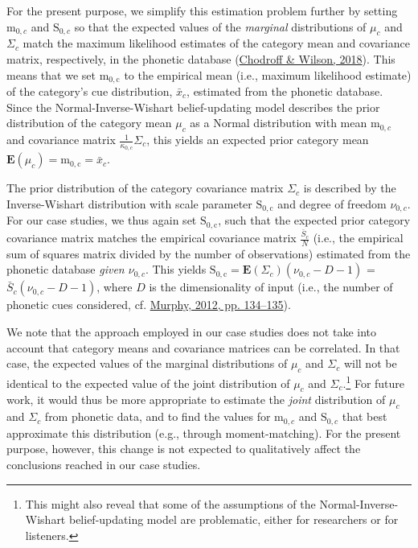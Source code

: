 \documentclass[
  11pt,
  english,
  man,floatsintext]{apa6}
\begin{document}
For the present purpose, we simplify this estimation problem further by setting \(\mathrm{m}_{0,c}\) and \(\mathrm{S}_{0,c}\) so that the expected values of the \emph{marginal} distributions of \(\mu_c\) and \(\Sigma_c\) match the maximum likelihood estimates of the category mean and covariance matrix, respectively, in the phonetic database (\protect\hyperlink{ref-chodroff-wilson2018}{Chodroff \& Wilson, 2018}). This means that we set \(\mathrm{m_{0,c}}\) to the empirical mean (i.e., maximum likelihood estimate) of the category's cue distribution, \(\bar{x}_c\), estimated from the phonetic database. Since the Normal-Inverse-Wishart belief-updating model describes the prior distribution of the category mean \(\mu_c\) as a Normal distribution with mean \(\mathrm{m}_{0,c}\) and covariance matrix \(\frac{1}{\kappa_{0,c}}\Sigma_c\), this yields an expected prior category mean \(\mathbf{E}(\mu_c) = \mathrm{m_{0,c}} = \bar{x}_c\).

The prior distribution of the category covariance matrix \(\Sigma_c\) is described by the Inverse-Wishart distribution with scale parameter \(\mathrm{S_{0,c}}\) and degree of freedom \(\nu_{0,c}\). For our case studies, we thus again set \(\mathrm{S_{0,c}}\), such that the expected prior category covariance matrix matches the empirical covariance matrix \(\frac{\bar{S}_c}{N}\) (i.e., the empirical sum of squares matrix divided by the number of observations) estimated from the phonetic database \emph{given \(\nu_{0,c}\)}. This yields \(\mathrm{S_{0,c}} = \mathbf{E}(\Sigma_c)(\nu_{0,c}-D-1)\) = \(\bar{S}_c(\nu_{0,c}-D-1)\), where \(D\) is the dimensionality of input (i.e., the number of phonetic cues considered, cf. \protect\hyperlink{ref-murphy2012}{Murphy, 2012, pp. 134--135}).

We note that the approach employed in our case studies does not take into account that category means and covariance matrices can be correlated. In that case, the expected values of the marginal distributions of \(\mu_c\) and \(\Sigma_c\) will not be identical to the expected value of the joint distribution of \(\mu_c\) and \(\Sigma_c\).\footnote{This might also reveal that some of the assumptions of the Normal-Inverse-Wishart belief-updating model are problematic, either for researchers or for listeners.} For future work, it would thus be more appropriate to estimate the \emph{joint} distribution of \(\mu_c\) and \(\Sigma_c\) from phonetic data, and to find the values for \(\mathrm{m}_{0,c}\) and \(\mathrm{S}_{0,c}\) that best approximate this distribution (e.g., through moment-matching). For the present purpose, however, this change is not expected to qualitatively affect the conclusions reached in our case studies.
\end{document}
